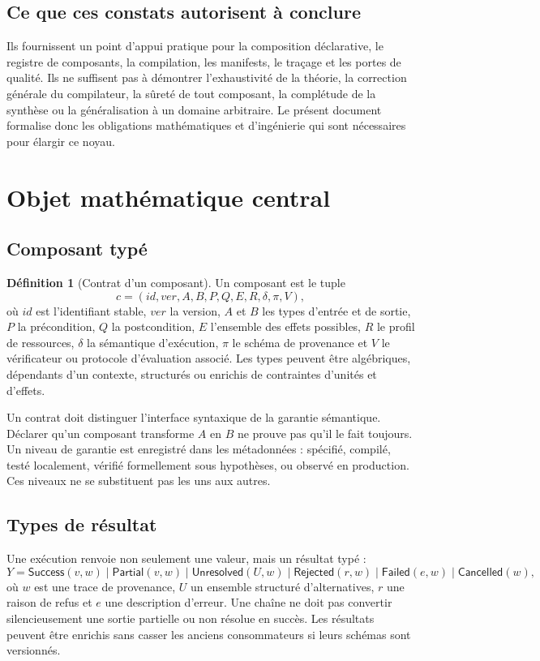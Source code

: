 \documentclass[11pt,a4paper]{article}
\theoremstyle{definition}
\newtheorem{definition}{Définition}[section]
\theoremstyle{plain}
\theoremstyle{remark}
\begin{document}
\subsection{Ce que ces constats autorisent à conclure}
Ils fournissent un point d'appui pratique pour la composition déclarative, le registre de composants, la compilation, les manifests, le traçage et les portes de qualité. Ils ne suffisent pas à démontrer l'exhaustivité de la théorie, la correction générale du compilateur, la sûreté de tout composant, la complétude de la synthèse ou la généralisation à un domaine arbitraire. Le présent document formalise donc les obligations mathématiques et d'ingénierie qui sont nécessaires pour élargir ce noyau.

\section{Objet mathématique central}
\subsection{Composant typé}
\begin{definition}[Contrat d'un composant]
Un composant est le tuple
\[
c=(id,ver,A,B,P,Q,E,R,\delta,\pi,V),
\]
où $id$ est l'identifiant stable, $ver$ la version, $A$ et $B$ les types d'entrée et de sortie, $P$ la précondition, $Q$ la postcondition, $E$ l'ensemble des effets possibles, $R$ le profil de ressources, $\delta$ la sémantique d'exécution, $\pi$ le schéma de provenance et $V$ le vérificateur ou protocole d'évaluation associé. Les types peuvent être algébriques, dépendants d'un contexte, structurés ou enrichis de contraintes d'unités et d'effets.
\end{definition}

Un contrat doit distinguer l'interface syntaxique de la garantie sémantique. Déclarer qu'un composant transforme $A$ en $B$ ne prouve pas qu'il le fait toujours. Un niveau de garantie est enregistré dans les métadonnées : spécifié, compilé, testé localement, vérifié formellement sous hypothèses, ou observé en production. Ces niveaux ne se substituent pas les uns aux autres.

\subsection{Types de résultat}
Une exécution renvoie non seulement une valeur, mais un résultat typé :
\[
Y = \mathsf{Success}(v,w) \mid \mathsf{Partial}(v,w) \mid \mathsf{Unresolved}(U,w)
\mid \mathsf{Rejected}(r,w) \mid \mathsf{Failed}(e,w) \mid \mathsf{Cancelled}(w),
\]
où $w$ est une trace de provenance, $U$ un ensemble structuré d'alternatives, $r$ une raison de refus et $e$ une description d'erreur. Une chaîne ne doit pas convertir silencieusement une sortie partielle ou non résolue en succès. Les résultats peuvent être enrichis sans casser les anciens consommateurs si leurs schémas sont versionnés.
\end{document}
